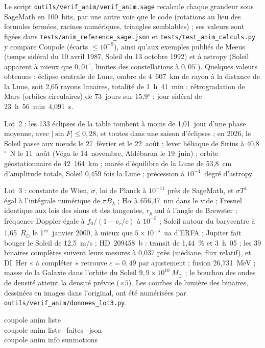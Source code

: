 Le script \texttt{outils/verif\_anim/verif\_anim.sage} recalcule chaque grandeur sous SageMath en 100~bits, par une
autre voie que le code (rotations au lieu des formules fermées, racines numériques, triangles semblables) ; ses
valeurs sont figées dans \texttt{tests/anim\_reference\_sage.json} et \texttt{tests/test\_anim\_calculs.py} y compare
Coupole (écarts $\le 10^{-9}$), ainsi qu'aux exemples publiés de Meeus (temps sidéral du 10 avril 1987,
Soleil du 13 octobre 1992) et à astropy (Soleil apparent à mieux que $0{,}01^\circ$, limites des constellations à
$0{,}05^\circ$). Quelques valeurs obtenues : éclipse centrale de Lune, ombre de 4~607~km de rayon à la distance de
la Lune, soit 2,65 rayons lunaires, totalité de 1~h~41~min ; rétrogradation de Mars (orbites circulaires) de 73~jours
sur 15,9$^\circ$ ; jour sidéral de 23~h~56~min~4,091~s.

Lot~2 : les 133 éclipses de la table tombent à moins de 1,01~jour d'une phase moyenne, avec $|\sin F|\le0{,}28$, et
toutes dans une saison d'éclipses ; en 2026, le Soleil passe aux nœuds le 27~février et le 22~août ; lever héliaque
de Sirius à 40,8$^\circ$~N le 11~août (Véga le 14~novembre, Aldébaran le 19~juin) ; orbite géostationnaire de
42~164~km ; marée d'équilibre de la Lune de 53,8~cm d'amplitude totale, Soleil 0,459 fois la Lune ; précession à
$10^{-4}$~degré d'astropy.

Lot~3 : constante de Wien, $\sigma$, loi de Planck à $10^{-11}$ près de SageMath, et $\sigma T^4$ égal à
l'intégrale numérique de $\pi B_\lambda$ ; H$\alpha$ à 656,47~nm dans le vide ; Fresnel identique aux lois des sinus et
des tangentes, $r_p$ nul à l'angle de Brewster ; fréquence Doppler égale à $f_0/(1-v_r/c)$ à $10^{-5}$ ; Soleil autour
du barycentre à 1,65~$R_\odot$ le 1\textsuperscript{er}~janvier 2000, à mieux que $5\times10^{-5}$~ua d'ERFA ; Jupiter
fait bouger le Soleil de 12,5~m/s ; HD~209458~b : transit de 1,44~\% et 3~h~05 ; les 39 binaires complètes suivent leurs
mesures à 0,037 près (médiane, flux relatif), et DI~Her « à compléter » retrouve $e=0{,}49$ par ajustement ; fusion
26,731~MeV ; masse de la Galaxie dans l'orbite du Soleil $9{,}9\times10^{10}~M_\odot$ ; le bouchon des ondes de densité
atteint la densité prévue ($\times5$).  Les courbes de lumière des binaires, dessinées en images dans l'original, ont été
numérisées par \texttt{outils/verif\_anim/donnees\_lot3.py}.

\begin{ccode}
coupole anim liste\\
coupole anim liste --faites --json\\
coupole anim info sunmotions
\end{ccode}


